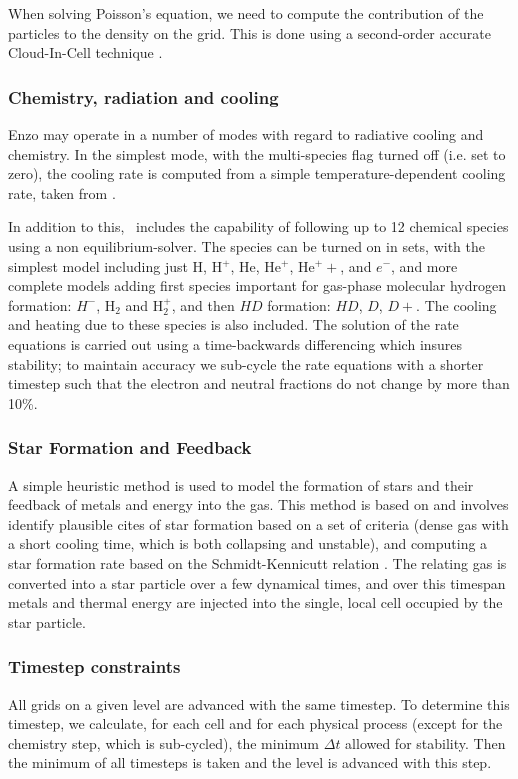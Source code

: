 When solving Poisson's equation, we need to compute the contribution of 
the particles to the density on the grid.  This is done using a second-order
accurate Cloud-In-Cell technique \citep{Hockney88}.

\subsubsection{Chemistry, radiation and cooling}

Enzo may operate in a number of modes with regard to radiative cooling and chemistry.  In the simplest mode, with the multi-species flag turned off (i.e. set to zero), the cooling rate is computed from a simple temperature-dependent cooling rate, taken from \citet{SW87}.  

In addition to this, \enzo\ includes the capability of following up to 12 chemical species using a non equilibrium-solver.  The species can be turned on in sets, with the simplest model including just H, H$^+$, He, He$^+$, He$^++$, and $e^-$, and more complete models adding first species important for gas-phase molecular hydrogen formation: $H^-$, H$_2$ and H$_2^+$, and then $HD$ formation: $HD$, $D$, $D+$.  The cooling and heating due to these species is also included.  The solution of the rate equations is carried out using a time-backwards differencing which insures stability; to maintain accuracy we sub-cycle the rate equations with a shorter timestep such that the electron and neutral fractions do not change by more than 10\%.

\subsubsection{Star Formation and Feedback}

A simple heuristic method is used to model the formation of stars and their feedback of metals and energy into the gas.  This method is based on \citep{CO1992} and involves identify plausible cites of star formation based on a set of criteria (dense gas with a short cooling time, which is both collapsing and unstable), and computing a star formation rate based on the Schmidt-Kennicutt relation \citep{K89}.  The relating gas is converted into a star particle over a few dynamical times, and over this timespan metals and thermal energy are injected into the single, local cell occupied by the star particle.

\subsubsection{Timestep constraints}

All grids on a given level are advanced with the same timestep.  To determine this timestep, we calculate, for each cell and for each physical process (except for the chemistry step, which is sub-cycled), the minimum $\Delta t$ allowed for stability.  Then the minimum of all timesteps is taken and the level is advanced with this step.


